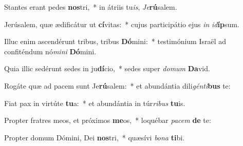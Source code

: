 \item Stantes erant pedes \textbf{nos}tri,~* in átriis tu\textit{is}, \textit{Je}\textbf{rú}salem.
\item Jerúsalem, quæ ædificátur ut \textbf{cí}vitas:~* cujus participátio ejus \textit{in} \textit{id}\textbf{íp}sum.
\item Illuc enim ascendérunt tribus, tribus \textbf{Dó}mini:~* testimónium Israël ad confiténdum nó\textit{mi}\textit{ni} \textbf{Dó}mini.
\item Quia illic sedérunt sedes in ju\textbf{dí}cio,~* sedes super \textit{do}\textit{mum} \textbf{Da}vid.
\item Rogáte quæ ad pacem sunt Je\textbf{rú}salem:~* et abundántia dili\textit{gén}\textit{ti}\textbf{bus} te:
\item Fiat pax in virtúte \textbf{tu}a:~* et abundántia in túr\textit{ri}\textit{bus} \textbf{tu}is.
\item Propter fratres meos, et próximos \textbf{me}os,~* loquébar \textit{pa}\textit{cem} \textbf{de} te:
\item Propter domum Dómini, Dei \textbf{nos}tri,~* quæsívi \textit{bo}\textit{na} \textbf{ti}bi.
